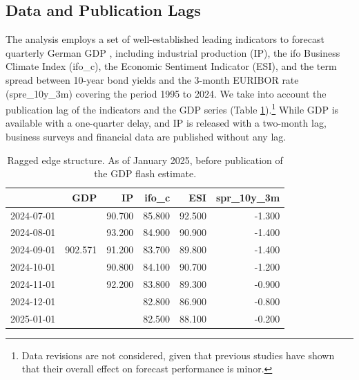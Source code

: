 \documentclass[11pt,a4paper]{article}
\begin{document}
\subsection{Data and Publication Lags}
The analysis employs a set of well-established leading indicators to forecast quarterly German GDP \citep{Drechsel2012financial,Heinisch2018bottom}, including industrial production (IP), the ifo Business Climate Index (ifo\_c), the Economic Sentiment Indicator (ESI), and the term spread between 10-year bond yields and the 3-month EURIBOR rate (spre\_10y\_3m) covering the period 1995 to 2024.  
We take into account the publication lag of the indicators and the GDP series (Table \ref{tab:data_stucture}).\footnote{Data revisions are not considered, given that previous studies \citep{Heinisch2019} have shown that their overall effect on forecast performance is minor.} 
While GDP is available with a one-quarter delay, and IP is released with a two-month lag, business surveys and financial data are published without any lag. %


\begin{table}[ht]
\centering
\begin{tabular}{rrrrrr}
  \hline
 & GDP & IP & ifo\_c & ESI & spr\_10y\_3m \\ 
  \hline
2024-07-01 &  & 90.700 & 85.800 & 92.500 & -1.300 \\ 
  2024-08-01 &  & 93.200 & 84.900 & 90.900 & -1.400 \\ 
  2024-09-01 &902.571  & 91.200 & 83.700 & 89.800 & -1.400 \\ 
  2024-10-01 &  & 90.800 & 84.100 & 90.700 & -1.200 \\ 
  2024-11-01 &  & 92.200 & 83.800 & 89.300 & -0.900 \\ 
  2024-12-01 &  &  & 82.800 & 86.900 & -0.800 \\ 
  2025-01-01 &  &  & 82.500 & 88.100 & -0.200 \\ 
   \hline
\end{tabular}
\caption{Ragged edge structure. As of January 2025, before publication of the GDP flash estimate.} 
\label{tab:data_stucture}
\end{table}
\end{document}
